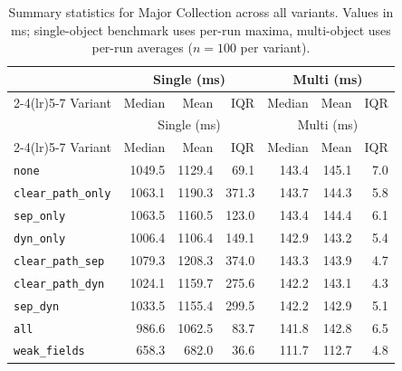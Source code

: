 \begin{longtable}[c]{l rrr rrr}
\caption[Major Collection summary statistics]{Summary statistics for Major Collection across all variants. Values in ms; single-object benchmark uses per-run maxima, multi-object uses per-run averages ($n=100$ per variant).}\label{tab:stats-major} \\
\toprule
 & \multicolumn{3}{c}{Single (ms)} & \multicolumn{3}{c}{Multi (ms)} \\
\cmidrule(lr){2-4}\cmidrule(lr){5-7}
Variant & Median & Mean & IQR & Median & Mean & IQR \\
\midrule
\endfirsthead
\toprule
 & \multicolumn{3}{c}{Single (ms)} & \multicolumn{3}{c}{Multi (ms)} \\
\cmidrule(lr){2-4}\cmidrule(lr){5-7}
Variant & Median & Mean & IQR & Median & Mean & IQR \\
\midrule
\endhead
\bottomrule
\endfoot
\texttt{none} & 1049.5 & 1129.4 & 69.1 & 143.4 & 145.1 & 7.0 \\
\texttt{clear\_path\_only} & 1063.1 & 1190.3 & 371.3 & 143.7 & 144.3 & 5.8 \\
\texttt{sep\_only} & 1063.5 & 1160.5 & 123.0 & 143.4 & 144.4 & 6.1 \\
\texttt{dyn\_only} & 1006.4 & 1106.4 & 149.1 & 142.9 & 143.2 & 5.4 \\
\texttt{clear\_path\_sep} & 1079.3 & 1208.3 & 374.0 & 143.3 & 143.9 & 4.7 \\
\texttt{clear\_path\_dyn} & 1024.1 & 1159.7 & 275.6 & 142.2 & 143.1 & 4.3 \\
\texttt{sep\_dyn} & 1033.5 & 1155.4 & 299.5 & 142.2 & 142.9 & 5.1 \\
\texttt{all} & 986.6 & 1062.5 & 83.7 & 141.8 & 142.8 & 6.5 \\
\texttt{weak\_fields} & 658.3 & 682.0 & 36.6 & 111.7 & 112.7 & 4.8 \\
\end{longtable}
